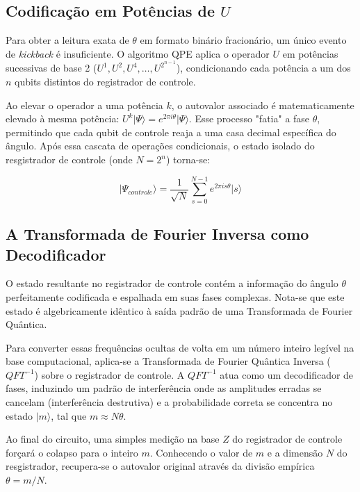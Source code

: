 \documentclass[12pt, a4paper]{article}
\newcommand{\ket}[1]{\lvert #1 \rangle}
\begin{document}
\subsection{Codificação em Potências de $U$}

Para obter a leitura exata de $\theta$ em formato binário fracionário, um único evento de \textit{kickback} é insuficiente. O algoritmo QPE aplica o operador $U$ em potências sucessivas de base 2 ($U^1, U^2, U^4, \dots, U^{2^{n-1}}$), condicionando cada potência a um dos $n$ qubits distintos do registrador de controle.

Ao elevar o operador a uma potência $k$, o autovalor associado é matematicamente elevado à mesma potência: $U^k\ket{\Psi} = e^{2\pi i \theta}\ket{\Psi}$. Esse processo "fatia" a fase $\theta$, permitindo que cada qubit de controle reaja a uma  casa decimal específica do ângulo. Após essa cascata de operações condicionais, o estado isolado do resgistrador de controle (onde $N = 2^n$) torna-se:

\begin{equation}
    \ket{\Psi_{controle}} = \frac{1}{\sqrt{N}} \sum_{s=0}^{N-1} e^{2\pi i s \theta} \ket{s}
\end{equation}

\subsection{A Transformada de Fourier Inversa como Decodificador}

O estado resultante no registrador de controle contém a informação do ângulo $\theta$ perfeitamente codificada e espalhada em suas fases complexas. Nota-se que este estado é algebricamente idêntico à saída padrão de uma Transformada de Fourier Quântica.

Para converter essas frequências ocultas de volta em um número inteiro legível na base computacional, aplica-se a Transformada de Fourier Quântica Inversa ($QFT^{-1}$) sobre o registrador de controle. A $QFT^{-1}$ atua como um decodificador de fases, induzindo um padrão de interferência onde as amplitudes erradas se cancelam (interferência destrutiva) e a probabilidade correta se concentra no estado $\ket{m}$, tal que $m \approx N\theta$.

Ao final do circuito, uma simples medição na base $Z$ do registrador de controle forçará o colapso para o inteiro $m$. Conhecendo o valor de $m$ e a dimensão $N$ do resgistrador, recupera-se o autovalor original através da divisão empírica $\theta = m/N$.
\end{document}

